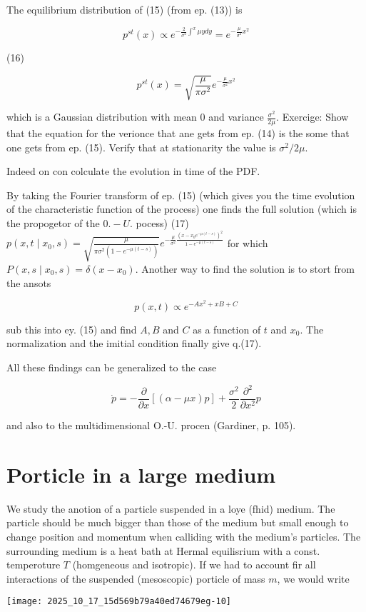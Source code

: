 The equilibrium distribution of (15) (from ep. (13)) is

$$ p^{s t}(x) \propto e^{-\frac{2}{\sigma^{2}} \int^{x} \mu y d y}=e^{-\frac{\mu}{\sigma^{2}} x^{2}} $$

(16)

$$ p^{s t}(x)=\sqrt{\frac{\mu}{\pi \sigma^{2}}} e^{-\frac{\mu}{\sigma^{2}} x^{2}} $$

which is a Gaussian distribution with mean 0 and variance $\frac{\sigma^{2}}{2 \mu}$.
Exercige: Show that the equation for the verionce that ane gets from ep. (14) is the some that one gets from ep. (15). Verify that at stationarity the value is $\sigma^{2} / 2 \mu$.

Indeed on con colculate the evolution in time of the PDF.

By taking the Fourier transform of ep. (15) (which gives you the time evolution of the characteristic function of the process) one finds the full solution (which is the propogetor of the $0 .-U$. pocess)
(17) $p\left(x, t \mid x_{0}, s\right)=\sqrt{\frac{\mu}{\pi \sigma^{2}\left(1-e^{-\mu(t-s)}\right)}} e^{-\frac{\mu}{\sigma^{2}} \frac{\left(x-x_{0} e^{-\mu(t-s)}\right)^{2}}{1-e^{-\mu(t-s)}}}$
for which $P\left(x, s \mid x_{0}, s\right)=\delta\left(x-x_{0}\right)$. Another way to find the solution is to stort from the ansots

$$ p(x, t) \propto e^{-A x^{2}+x B+C} $$

sub this into ey. (15) and find $A, B$ and $C$ as a function of $t$ and $x_{0}$. The normalization and the imitial condition finally give q.(17).

All these findings can be generalized to the case

$$ \dot{p}=-\frac{\partial}{\partial x}[(\alpha-\mu x) p]+\frac{\sigma^{2}}{2} \frac{\partial^{2}}{\partial x^{2}} p $$

and also to the multidimensional O.-U. procen (Gardiner, p. 105).

\section*{Porticle in a large medium}
We study the anotion of a particle suspended in a loye (fhid) medium. The particle should be much bigger than those of the medium but small enough to change position and momentum when calliding with the medium's particles. The surrounding medium is a heat bath at Hermal equilisrium with a const. temperoture $T$ (homgeneous and isotropic).
If we had to account fir all interactions of the suspended (mesoscopic) porticle of mass $m$, we would write
\begin{center}
\texttt{[image: 2025\_10\_17\_15d569b79a40ed74679eg-10]}
\end{center}


